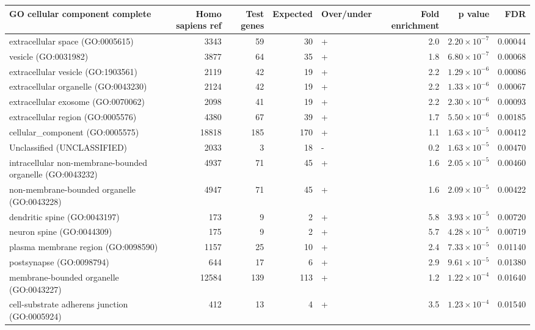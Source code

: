 \begin{table}[ht]
\centering
\begin{adjustbox}{width=\textwidth}
\begin{tabular}{lrrrlrrr}
  \hline
GO cellular component complete & Homo sapiens ref & Test genes & Expected & Over/under & Fold enrichment & p value & FDR \\ 
  \hline
extracellular space (GO:0005615) & 3343 & 59 & 30 & + & 2.0 & $2.20 \times 10^{-7}$ & 0.00044 \\ 
  vesicle (GO:0031982) & 3877 & 64 & 35 & + & 1.8 & $6.80 \times 10^{-7}$ & 0.00068 \\ 
  extracellular vesicle (GO:1903561) & 2119 & 42 & 19 & + & 2.2 & $1.29 \times 10^{-6}$ & 0.00086 \\ 
  extracellular organelle (GO:0043230) & 2124 & 42 & 19 & + & 2.2 & $1.33 \times 10^{-6}$ & 0.00067 \\ 
  extracellular exosome (GO:0070062) & 2098 & 41 & 19 & + & 2.2 & $2.30 \times 10^{-6}$ & 0.00093 \\ 
  extracellular region (GO:0005576) & 4380 & 67 & 39 & + & 1.7 & $5.50 \times 10^{-6}$ & 0.00185 \\ 
  cellular\_component (GO:0005575) & 18818 & 185 & 170 & + & 1.1 & $1.63 \times 10^{-5}$ & 0.00412 \\ 
  Unclassified (UNCLASSIFIED) & 2033 & 3 & 18 & - & 0.2 & $1.63 \times 10^{-5}$ & 0.00470 \\ 
  intracellular non-membrane-bounded organelle (GO:0043232) & 4937 & 71 & 45 & + & 1.6 & $2.05 \times 10^{-5}$ & 0.00460 \\ 
  non-membrane-bounded organelle (GO:0043228) & 4947 & 71 & 45 & + & 1.6 & $2.09 \times 10^{-5}$ & 0.00422 \\ 
  dendritic spine (GO:0043197) & 173 & 9 & 2 & + & 5.8 & $3.93 \times 10^{-5}$ & 0.00720 \\ 
  neuron spine (GO:0044309) & 175 & 9 & 2 & + & 5.7 & $4.28 \times 10^{-5}$ & 0.00719 \\ 
  plasma membrane region (GO:0098590) & 1157 & 25 & 10 & + & 2.4 & $7.33 \times 10^{-5}$ & 0.01140 \\ 
  postsynapse (GO:0098794) & 644 & 17 & 6 & + & 2.9 & $9.61 \times 10^{-5}$ & 0.01380 \\ 
  membrane-bounded organelle (GO:0043227) & 12584 & 139 & 113 & + & 1.2 & $1.22 \times 10^{-4}$ & 0.01640 \\ 
  cell-substrate adherens junction (GO:0005924) & 412 & 13 & 4 & + & 3.5 & $1.23 \times 10^{-4}$ & 0.01540 \\ 

\end{tabular}
\end{adjustbox}
\end{table}
